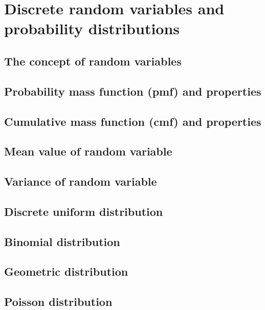 \section{Discrete random variables and probability distributions}
\subsection{The concept of random variables}
\subsection{Probability mass function (pmf) and properties}
\subsection{Cumulative mass function (cmf) and properties}
\subsection{Mean value of random variable}
\subsection{Variance of random variable}
\subsection{Discrete uniform distribution}
\subsection{Binomial distribution}
\subsection{Geometric distribution}
\subsection{Poisson distribution}
